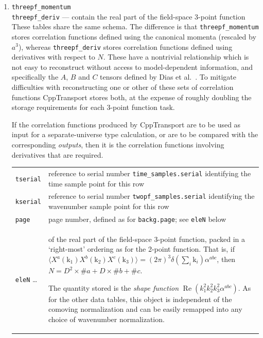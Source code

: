 \documentclass[11pt,a4paper]{article}
\newcommand{\vect}[1]{\bm{\mathrm{{#1}}}}
\newcommand{\packagefont}{\sffamily}
\newcommand{\CppTransport}{{\packagefont CppTransport}}
\newcommand{\semibold}[1]{{\fontseries{b}\selectfont{#1}}}
\newenvironment{sqltablelist}{\renewcommand{\arraystretch}{1.3}\small}{}
\DeclareMathOperator{\realpart}{Re}
\renewcommand{\Re}{\realpart}
\begin{document}
\begin{sqltablelist}
\begin{enumerate}
    \item \texttt{threepf_momentum} \\
    \texttt{threepf_deriv} --- contain
    the real part of the field-space 3-point function \\
    These tables share the same schema. The difference is that
    \texttt{threepf_momentum} stores correlation functions defined using
    the canonical momenta (rescaled by $a^3$), whereas
    \texttt{threepf_deriv} stores correlation functions defined using
    derivatives with respect to $N$.
    These have a nontrivial relationship which is not easy to reconstruct without
    access to model-dependent information, and specifically the $A$, $B$ and
    $C$ tensors defined by Dias et al.~\cite{}.
    To mitigate difficulties with reconstructing one or other of these
    sets of correlation functions {\CppTransport} stores both, at the expense
    of roughly doubling the storage requirements for each 3-point function task.
    
    If the correlation functions produced by {\CppTransport} are to be used as
    input for a separate-universe type calculation,
    or are to be compared with the corresponding \emph{outputs},
    then it is the correlation functions involving derivatives that are required.
    \\
    \begin{tabular}{p{2.5cm}p{11.2cm}}
        \texttt{tserial} & reference to serial number
        \texttt{time_samples.serial} identifying the time sample point for this row \\
        \texttt{kserial} & reference to serial number
        \texttt{twopf_samples.serial} identifying the wavenumber sample point for this row \\
        \texttt{page} & page number, defined as for \texttt{backg.page}; see
        \texttt{eleN} below \\
        \texttt{eleN} \ldots & \semibold{dimensionless components}
        of the real part of the field-space 3-point
        function, packed in a `right-most' ordering as for the 2-point function.
        That is, if
        $\langle X^a(\vect{k}_1) X^b(\vect{k}_2) X^c(\vect{k}_3) \rangle =
        (2\pi)^3 \delta(\sum_i \vect{k}_i) \alpha^{abc}$,
        then
        $N = D^2 \times \#a + D \times \#b + \#c$.
        
        The quantity stored is the \emph{shape function}
        $\Re(k_1^2 k_2^2 k_3^2 \alpha^{abc})$.
        As for the other data tables, this object is independent of the
        comoving normalization and can be easily remapped into
        any choice of wavenumber normalization.
    \end{tabular}
\end{enumerate}    
\end{sqltablelist}
\end{document}
